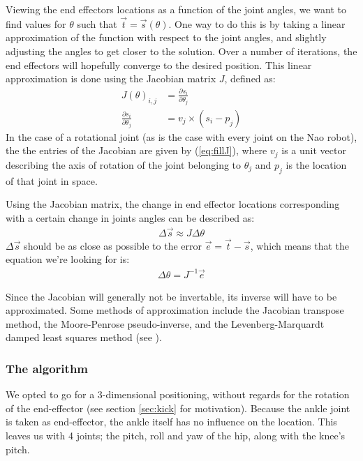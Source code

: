 \documentclass[a4paper]{article}
\begin{document}
Viewing the end effectors locations as a function of the joint angles,
we want to find values for $\theta$ such that $\vec{t} =
\vec{s}(\theta)$. One way to do this is by taking a linear
approximation of the function with respect to the joint angles, and
slightly adjusting the angles to get closer to the solution.  Over a
number of iterations, the end effectors will hopefully converge to the
desired position.  This linear approximation is done using the
Jacobian matrix $J$, defined as:
\begin{align}
  J(\theta)_{i, j} &= \frac{\partial s_i}{\partial \theta_j} \\
  \frac{\partial s_i}{\partial \theta_j} &= v_j \times (s_i - p_j)    \label{eq:fillJ}
\end{align}
In the case of a rotational joint (as is the case with every joint on
the Nao robot), the the entries of the Jacobian are given by
(\ref{eq:fillJ}), where $v_j$ is a unit vector describing the axis of
rotation of the joint belonging to $\theta_j$ and $p_j$ is the
location of that joint in space.

Using the Jacobian matrix, the change in end effector locations
corresponding with a certain change in joints angles can be described
as:
\begin{align*}
  \Delta \vec{s} \approx J \Delta \theta
\end{align*}
$\Delta \vec{s}$ should be as close as possible to the error $\vec{e}
= \vec{t} - \vec{s}$, which means that the equation
we're looking for is:
\begin{align*}
  \Delta \theta = J^{-1} \vec{e}
\end{align*}

Since the Jacobian will generally not be invertable, its inverse will
have to be approximated. Some methods of approximation include the
Jacobian transpose method, the Moore-Penrose pseudo-inverse, and the
Levenberg-Marquardt damped least squares method (see \cite{Buss2009}).

\subsubsection{The algorithm}
We opted to go for a 3-dimensional positioning, without regards for the rotation
of the end-effector (see section \ref{sec:kick} for motivation). Because the
ankle joint is taken as end-effector, the ankle itself has no influence on the
location. This leaves us with 4 joints; the pitch, roll and yaw of the hip,
along with the knee's pitch.
\end{document}
